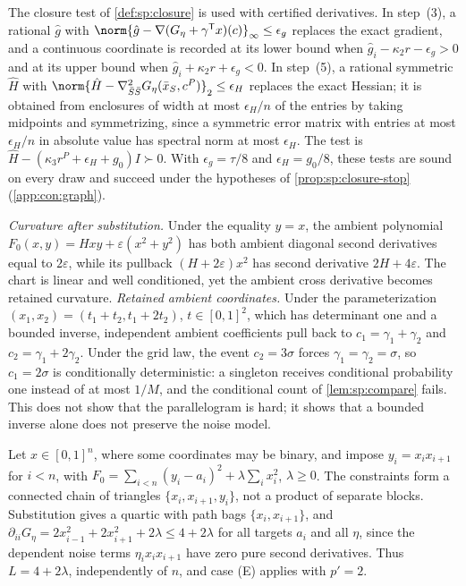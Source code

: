 The closure test of \cref{def:sp:closure} is used with certified
derivatives. In step~(3), a rational $\hat g$ with
$\norm{\hat g-\nabla(G_\eta+\gamma^{\mathsf T}x)(c)}_\infty\le\epsilon_g$
replaces the exact gradient, and a continuous coordinate is recorded at its
lower bound when $\hat g_i-\kappa_2r-\epsilon_g>0$ and at its upper bound
when $\hat g_i+\kappa_2r+\epsilon_g<0$. In step~(5), a rational symmetric
$\hat H$ with
$\norm{\hat H-\nabla^2_{\bar S\bar S}G_\eta(\bar x_S,c^P)}_2\le\epsilon_H$
replaces the exact Hessian; it is obtained from enclosures of width at most
$\epsilon_H/n$ of the entries by taking midpoints and symmetrizing, since a
symmetric error matrix with entries at most $\epsilon_H/n$ in absolute value
has spectral norm at most $\epsilon_H$. The test is
$\hat H-(\kappa_3r^P+\epsilon_H+g_0)I\succ0$. With
$\epsilon_g=\tau/8$ and $\epsilon_H=g_0/8$, these tests are sound on every
draw and succeed under the hypotheses of \cref{prop:sp:closure-stop}
(\cref{app:con:graph}).

\begin{example}\label{ex:con:graph-curv}
\emph{Curvature after substitution.} Under the equality $y=x$, the ambient
polynomial $F_0(x,y)=Hxy+\varepsilon(x^2+y^2)$ has both ambient diagonal
second derivatives equal to $2\varepsilon$, while its pullback
$(H+2\varepsilon)x^2$ has second derivative $2H+4\varepsilon$. The chart is
linear and well conditioned, yet the ambient cross derivative becomes
retained curvature. \emph{Retained ambient coordinates.} Under the
parameterization $(x_1,x_2)=(t_1+t_2,t_1+2t_2)$, $t\in[0,1]^2$, which has
determinant one and a bounded inverse, independent ambient coefficients pull
back to $c_1=\gamma_1+\gamma_2$ and $c_2=\gamma_1+2\gamma_2$. Under the grid
law, the event $c_2=3\sigma$ forces $\gamma_1=\gamma_2=\sigma$, so $c_1=2\sigma$
is conditionally deterministic: a singleton receives conditional probability
one instead of at most $1/M$, and the conditional count of
\cref{lem:sp:compare} fails. This does not show that the parallelogram is
hard; it shows that a bounded inverse alone does not preserve the noise model.
\end{example}

\begin{example}\label{ex:con:chain}
Let $x\in[0,1]^n$, where some coordinates may be binary, and impose
$y_i=x_ix_{i+1}$ for $i<n$, with
$F_0=\sum_{i<n}(y_i-a_i)^2+\lambda\sum_ix_i^2$, $\lambda\ge0$. The constraints
form a connected chain of triangles $\{x_i,x_{i+1},y_i\}$, not a product of
separate blocks. Substitution gives a quartic with path bags
$\{x_i,x_{i+1}\}$, and $\partial_{ii}G_\eta=2x_{i-1}^2+2x_{i+1}^2+2\lambda\le
4+2\lambda$ for all targets $a_i$ and all $\eta$, since the dependent noise
terms $\eta_ix_ix_{i+1}$ have zero pure second derivatives. Thus
$L=4+2\lambda$, independently of $n$, and case (E) applies with $p'=2$.
\end{example}

